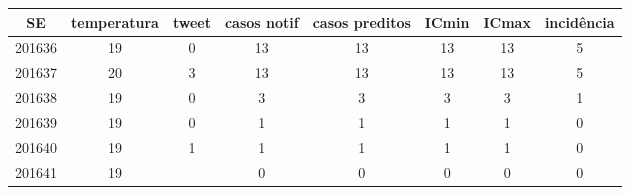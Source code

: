\begin{tabular}{c|ccccccc}
  \hline
SE & temperatura & tweet & casos notif & casos preditos & ICmin & ICmax & incidência \\ 
  \hline
201636 & 19 & 0 & 13 & 13 & 13 & 13 & 5 \\ 
  201637 & 20 & 3 & 13 & 13 & 13 & 13 & 5 \\ 
  201638 & 19 & 0 & 3 & 3 & 3 & 3 & 1 \\ 
  201639 & 19 & 0 & 1 & 1 & 1 & 1 & 0 \\ 
  201640 & 19 & 1 & 1 & 1 & 1 & 1 & 0 \\ 
  201641 & 19 &  & 0 & 0 & 0 & 0 & 0 \\ 
   \hline
\end{tabular}
